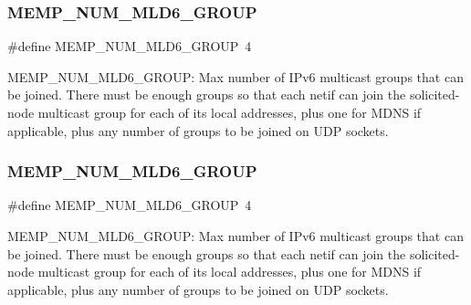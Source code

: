 \subsubsection{\texorpdfstring{M\+E\+M\+P\+\_\+\+N\+U\+M\+\_\+\+M\+L\+D6\+\_\+\+G\+R\+O\+UP}{MEMP\_NUM\_MLD6\_GROUP}\hspace{0.1cm}{\footnotesize\ttfamily [1/2]}}
{\footnotesize\ttfamily \#define M\+E\+M\+P\+\_\+\+N\+U\+M\+\_\+\+M\+L\+D6\+\_\+\+G\+R\+O\+UP~4}

M\+E\+M\+P\+\_\+\+N\+U\+M\+\_\+\+M\+L\+D6\+\_\+\+G\+R\+O\+UP\+: Max number of I\+Pv6 multicast groups that can be joined. There must be enough groups so that each netif can join the solicited-\/node multicast group for each of its local addresses, plus one for M\+D\+NS if applicable, plus any number of groups to be joined on U\+DP sockets. \mbox{\label{group__lwip__opts__mld6_ga89e92d8de8898696e797f13fdd169494}} 
\subsubsection{\texorpdfstring{M\+E\+M\+P\+\_\+\+N\+U\+M\+\_\+\+M\+L\+D6\+\_\+\+G\+R\+O\+UP}{MEMP\_NUM\_MLD6\_GROUP}\hspace{0.1cm}{\footnotesize\ttfamily [2/2]}}
{\footnotesize\ttfamily \#define M\+E\+M\+P\+\_\+\+N\+U\+M\+\_\+\+M\+L\+D6\+\_\+\+G\+R\+O\+UP~4}

M\+E\+M\+P\+\_\+\+N\+U\+M\+\_\+\+M\+L\+D6\+\_\+\+G\+R\+O\+UP\+: Max number of I\+Pv6 multicast groups that can be joined. There must be enough groups so that each netif can join the solicited-\/node multicast group for each of its local addresses, plus one for M\+D\+NS if applicable, plus any number of groups to be joined on U\+DP sockets. 